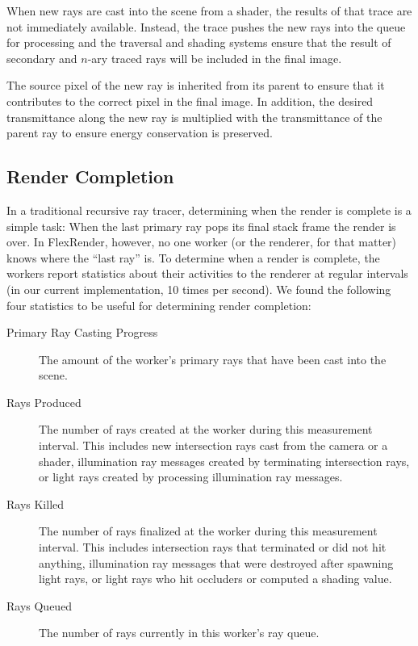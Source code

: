 \documentclass[a4paper,twoside]{article}
\begin{document}
When new rays are cast into the scene from a shader, the results of that trace
are not immediately available. Instead, the trace pushes the new rays into the
queue for processing and the traversal and shading systems ensure that the
result of secondary and $n$-ary traced rays will be included in the final image.

The source pixel of the new ray is inherited from its parent to ensure that it
contributes to the correct pixel in the final image. In addition, the desired
transmittance along the new ray is multiplied with the transmittance of the
parent ray to ensure energy conservation is preserved.

\subsection{Render Completion}
\label{completion}

In a traditional recursive ray tracer, determining when the render is complete
is a simple task: When the last primary ray pops its final stack frame
the render is over. In FlexRender, however, no one worker (or the renderer, for
that matter) knows where the ``last ray'' is. To determine when a render is
complete,  the workers report statistics about their activities to the renderer
at regular intervals (in our current implementation, 10 times per second). We
found the following four statistics to be useful for determining render
completion:

\begin{description}
   \item[Primary Ray Casting Progress] The amount of the worker's primary rays
      that have been cast into the scene.
   \item[Rays Produced] The number of rays created at the worker during this
      measurement interval. This includes new intersection rays cast from the
      camera or a shader, illumination ray messages created by terminating
      intersection rays, or light rays created by processing illumination ray
      messages.
   \item[Rays Killed] The number of rays finalized at the worker during this
      measurement interval. This includes intersection rays that terminated or
      did not hit anything, illumination ray messages that were destroyed after
      spawning light rays, or light rays who hit occluders or computed a shading
      value.
   \item[Rays Queued] The number of rays currently in this worker's ray queue.
\end{description}
\end{document}
